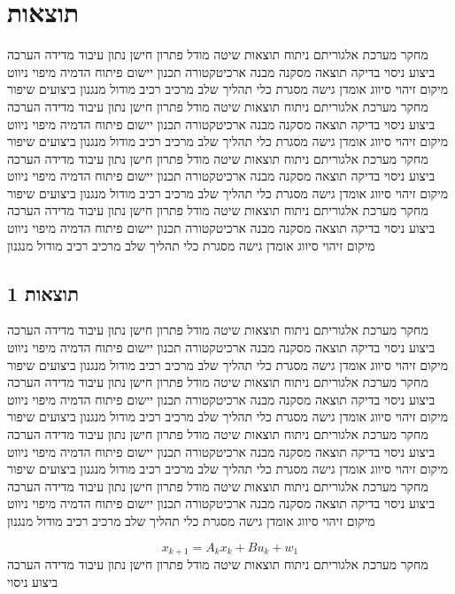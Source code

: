 \section{תוצאות}
\label{sec:ch08}

מחקר מערכת אלגוריתם ניתוח תוצאות שיטה מודל פתרון חישן נתון עיבוד מדידה הערכה ביצוע ניסוי בדיקה תוצאה מסקנה מבנה ארכיטקטורה תכנון יישום פיתוח הדמיה מיפוי ניווט מיקום זיהוי סיווג אומדן גישה מסגרת כלי תהליך שלב מרכיב רכיב מודול מנגנון ביצועים שיפור מחקר מערכת אלגוריתם ניתוח תוצאות שיטה מודל פתרון חישן נתון עיבוד מדידה הערכה ביצוע ניסוי בדיקה תוצאה מסקנה מבנה ארכיטקטורה תכנון יישום פיתוח הדמיה מיפוי ניווט מיקום זיהוי סיווג אומדן גישה מסגרת כלי תהליך שלב מרכיב רכיב מודול מנגנון ביצועים שיפור מחקר מערכת אלגוריתם ניתוח תוצאות שיטה מודל פתרון חישן נתון עיבוד מדידה הערכה ביצוע ניסוי בדיקה תוצאה מסקנה מבנה ארכיטקטורה תכנון יישום פיתוח הדמיה מיפוי ניווט מיקום זיהוי סיווג אומדן גישה מסגרת כלי תהליך שלב מרכיב רכיב מודול מנגנון ביצועים שיפור מחקר מערכת אלגוריתם ניתוח תוצאות שיטה מודל פתרון חישן נתון עיבוד מדידה הערכה ביצוע ניסוי בדיקה תוצאה מסקנה מבנה ארכיטקטורה תכנון יישום פיתוח הדמיה מיפוי ניווט מיקום זיהוי סיווג אומדן גישה מסגרת כלי תהליך שלב מרכיב רכיב מודול מנגנון

\subsection{תוצאות 1}
\label{sub:ch08_1}
מחקר מערכת אלגוריתם ניתוח תוצאות שיטה מודל פתרון חישן נתון עיבוד מדידה הערכה ביצוע ניסוי בדיקה תוצאה מסקנה מבנה ארכיטקטורה תכנון יישום פיתוח הדמיה מיפוי ניווט מיקום זיהוי סיווג אומדן גישה מסגרת כלי תהליך שלב מרכיב רכיב מודול מנגנון ביצועים שיפור מחקר מערכת אלגוריתם ניתוח תוצאות שיטה מודל פתרון חישן נתון עיבוד מדידה הערכה ביצוע ניסוי בדיקה תוצאה מסקנה מבנה ארכיטקטורה תכנון יישום פיתוח הדמיה מיפוי ניווט מיקום זיהוי סיווג אומדן גישה מסגרת כלי תהליך שלב מרכיב רכיב מודול מנגנון ביצועים שיפור מחקר מערכת אלגוריתם ניתוח תוצאות שיטה מודל פתרון חישן נתון עיבוד מדידה הערכה ביצוע ניסוי בדיקה תוצאה מסקנה מבנה ארכיטקטורה תכנון יישום פיתוח הדמיה מיפוי ניווט מיקום זיהוי סיווג אומדן גישה מסגרת כלי תהליך שלב מרכיב רכיב מודול מנגנון ביצועים שיפור מחקר מערכת אלגוריתם ניתוח תוצאות שיטה מודל פתרון חישן נתון עיבוד מדידה הערכה ביצוע ניסוי בדיקה תוצאה מסקנה מבנה ארכיטקטורה תכנון יישום פיתוח הדמיה מיפוי ניווט מיקום זיהוי סיווג אומדן גישה מסגרת כלי תהליך שלב מרכיב רכיב מודול מנגנון

\begin{equation}
    x_{k+1} = A_{k} x_k + B u_{k} + w_{1}
    \label{eq:ch08_1}
\end{equation}
מחקר מערכת אלגוריתם ניתוח תוצאות שיטה מודל פתרון חישן נתון עיבוד מדידה הערכה ביצוע ניסוי

